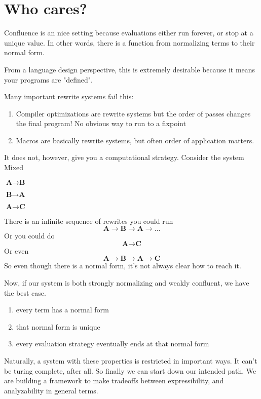 \documentclass[12pt]{article}
\begin{document}
\section{Who cares?}
Confluence is an nice setting because evaluations either run forever, or stop at a unique value.
In other words, there is a function from normalizing terms to their normal form. 

From a language design perspective, this is extremely desirable because it means your programs are "defined".

Many important rewrite systems fail this:
\begin{enumerate}
    \item Compiler optimizations are rewrite systems but the order of passes changes the final program! No obvious way to run to a fixpoint
    \item Macros are basically rewrite systems, but often order of application matters.
\end{enumerate}

It does not, however, give you a computational strategy. Consider the system Mixed
\begin{description}
    \item $\textbf{A} \rightarrow \textbf{B}$
    \item $\textbf{B} \rightarrow \textbf{A}$
    \item $\textbf{A} \rightarrow \textbf{C}$
\end{description}
There is an infinite sequence of rewrites you could run
\[
  \textbf{A} \rightarrow \textbf{B}\rightarrow \textbf{A} \rightarrow ...
\]
Or you could do
\[
  \textbf{A} \rightarrow \textbf{C}
\]
Or even
\[
  \textbf{A} \rightarrow \textbf{B}\rightarrow \textbf{A} \rightarrow \textbf{C}
\]
So even though there is a normal form, it's not always clear how to reach it.

Now, if our system is both strongly normalizing and weakly confluent, we have the best case.
\begin{enumerate}
    \item every term has a normal form
    \item that normal form is unique
    \item every evaluation strategy eventually ends at that normal form
\end{enumerate}

Naturally, a system with these properties is restricted in important ways.
It can't be turing complete, after all.
So finally we can start down our intended path.
We are building a framework to make tradeoffs between expressibility, and analyzability in general terms.
\end{document}
